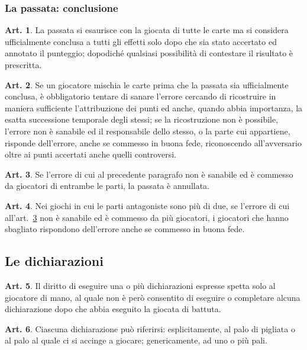 \documentclass[italian,a4paper]{book}
\theoremstyle{definition}
\newtheorem{art}{Art.}
\begin{document}
\subsubsection{La passata: conclusione}
\begin{art}
    La passata si esaurisce con la giocata di tutte le carte ma si considera ufficialmente conclusa a tutti gli effetti solo dopo che sia stato accertato ed annotato il punteggio; dopodiché qualsiasi possibilità di contestare il risultato è prescritta.
\end{art}
\begin{art}
    Se un giocatore mischia le carte prima che la passata sia ufficialmente conclusa, è obbligatorio tentare di sanare l'errore cercando di ricostruire in maniera sufficiente l'attribuzione dei punti ed anche, quando abbia importanza, la esatta successione temporale degli stessi; se la ricostruzione non è possibile, l'errore non è sanabile ed il responsabile dello stesso, o la parte cui appartiene, risponde dell'errore, anche se commesso in buona fede, riconoscendo all'avversario oltre ai punti accertati anche quelli controversi.
\end{art}
\begin{art}\label{err.pass}
    Se l'errore di cui al precedente paragrafo non è sanabile ed è commesso da giocatori di entrambe le parti, la passata è annullata.
\end{art}
\begin{art}\label{passata.fine}
    Nei giochi in cui le parti antagoniste sono più di due, se l'errore di
    cui all'art.~\ref{err.pass} non è sanabile ed è commesso da più giocatori, i giocatori che hanno sbagliato rispondono dell'errore anche se commesso in buona fede.
\end{art}
\subsection{Le dichiarazioni}
\begin{art}\label{diritto.dich}
    Il diritto di eseguire una o più dichiarazioni espresse spetta solo al giocatore di mano, al quale non è però consentito di eseguire o completare alcuna dichiarazione dopo che abbia eseguito la giocata di battuta.
\end{art}
\begin{art}
    Ciascuna dichiarazione può riferirsi: esplicitamente, al palo di pigliata o al palo al quale ci si accinge a giocare;  genericamente, ad uno o più pali.
\end{art}
\end{document}
